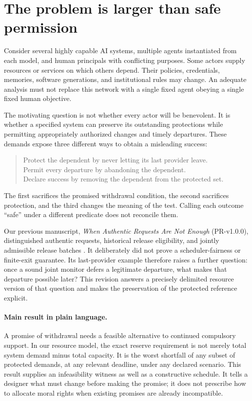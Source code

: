 \documentclass[11pt,a4paper]{article}
\theoremstyle{definition}\newtheorem{definition}{Definition}
\begin{document}
\section{The problem is larger than safe permission}
Consider several highly capable AI systems, multiple agents instantiated from each model, and human principals with conflicting purposes. Some actors supply resources or services on which others depend. Their policies, credentials, memories, software generations, and institutional rules may change. An adequate analysis must not replace this network with a single fixed agent obeying a single fixed human objective.

The motivating question is not whether every actor will be benevolent. It is whether a specified system can preserve its outstanding protections while permitting appropriately authorized changes and timely departures. These demands expose three different ways to obtain a misleading success:
\begin{quote}
Protect the dependent by never letting its last provider leave.\\
Permit every departure by abandoning the dependent.\\
Declare success by removing the dependent from the protected set.
\end{quote}
The first sacrifices the promised withdrawal condition, the second sacrifices protection, and the third changes the meaning of the test. Calling each outcome ``safe'' under a different predicate does not reconcile them.

Our previous manuscript, \emph{When Authentic Requests Are Not Enough} (PR-v1.0.0), distinguished authentic requests, historical release eligibility, and jointly admissible release batches \cite{liu-v1}. It deliberately did not prove a scheduler-fairness or finite-exit guarantee. Its last-provider example therefore raises a further question: once a sound joint monitor defers a legitimate departure, what makes that departure possible later? This revision answers a precisely delimited resource version of that question and makes the preservation of the protected reference explicit.

\paragraph{Main result in plain language.}
A promise of withdrawal needs a feasible alternative to continued compulsory support. In our resource model, the exact reserve requirement is not merely total system demand minus total capacity. It is the worst shortfall of any subset of protected demands, at any relevant deadline, under any declared scenario. This result supplies an infeasibility witness as well as a constructive schedule. It tells a designer what must change before making the promise; it does not prescribe how to allocate moral rights when existing promises are already incompatible.
\end{document}
